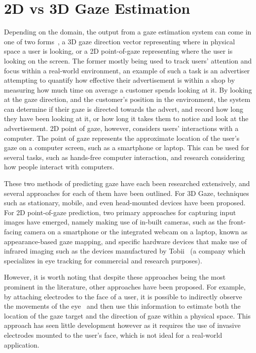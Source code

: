 \documentclass{report}
\begin{document}
\section{2D vs 3D Gaze Estimation} 

Depending on the domain, the output from a gaze estimation system can come in one of two forms~\cite{liu2022in}, a 3D gaze direction vector representing where in physical space a user is looking, or a 2D point-of-gaze representing where the user is looking on the screen. The former mostly being used to track users' attention and focus within a real-world environment, an example of such a task is an advertiser attempting to quantify how effective their advertisement is within a shop by measuring how much time on average a customer spends looking at it. By looking at the gaze direction, and the customer's position in the environment, the system can determine if their gaze is directed towards the advert, and record how long they have been looking at it, or how long it takes them to notice and look at the advertisement. 2D point of gaze, however, considers users' interactions with a computer. The point of gaze represents the approximate location of the user's gaze on a computer screen, such as a smartphone or laptop. This can be used for several tasks, such as hands-free computer interaction, and research considering how people interact with computers. 

These two methods of predicting gaze have each been researched extensively, and several approaches for each of them have been outlined. For 3D Gaze, techniques such as stationary, mobile, and even head-mounted devices have been proposed. For 2D point-of-gaze prediction, two primary approaches for capturing input images have emerged, namely making use of in-built cameras, such as the front-facing camera on a smartphone or the integrated webcam on a laptop, known as appearance-based gaze mapping, and specific hardware devices that make use of infrared imaging such as the devices manufactured by Tobii~\cite{tobiiprofusion} (a company which specializes in eye tracking for commercial and research purposes). 

However, it is worth noting that despite these approaches being the most prominent in the literature, other approaches have been proposed. For example, by attaching electrodes to the face of a user, it is possible to indirectly observe the movements of the eye~\cite{young1975survey} and then use this information to estimate both the location of the gaze target and the direction of gaze within a physical space. This approach has seen little development however as it requires the use of invasive electrodes mounted to the user's face, which is not ideal for a real-world application. 
\end{document}
